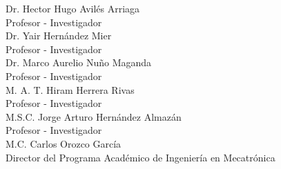 \documentclass[11pt,letterpaper,twoside]{report}
\begin{document}
	  Dr. Hector Hugo Avilés Arriaga\\
	  Profesor - Investigador\\[0.3 cm]
	  
	  Dr. Yair Hernández Mier\\
	  Profesor - Investigador\\[0.3 cm]
	  
	  Dr. Marco Aurelio Nuño Maganda\\
	  Profesor - Investigador\\[0.3 cm]
	  
	  M. A. T. Hiram Herrera Rivas\\
	  Profesor - Investigador\\[0.3 cm]
	  
	  M.S.C. Jorge Arturo Hernández Almazán\\
	  Profesor - Investigador\\[0.3 cm]
	  
	  M.C. Carlos Orozco García\\
	  Director del Programa Académico de Ingeniería en Mecatrónica
	  
	  	
	  	\pagebreak
	  	
	  	
	  	
\end{document}
